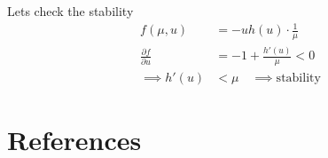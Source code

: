 \documentclass{article}
\theoremstyle{remark}
\begin{document}
Lets check the stability \[
  \begin{split}
f\left( \mu ,u \right) &=  -u h\left( u \right) \cdot \frac{1}{\mu } \\
\frac{\partial f}{\partial u}  &=  -1 + \frac{h' \left( u \right)}{\mu }  < 0 \\
\implies  h' \left( u \right)  & < \mu \quad  \implies \text{stability}
  \end{split} 
\] 


\newpage

\section{References}%
\label{sec:references}


  


\end{document}
